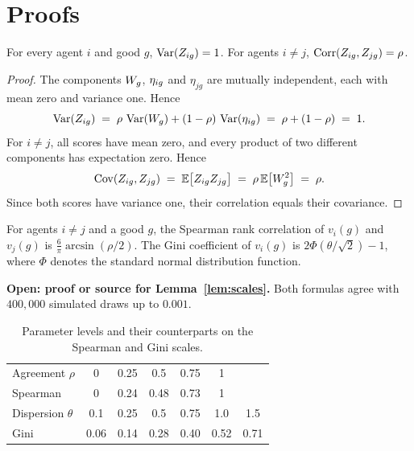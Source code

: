 \chapter{Proofs}\label{app:proofs}

\begin{lemma}\label{lem:scores}
For every agent $i$ and good $g$, $\operatorname{Var}(Z_{ig})=1$. For agents $i\neq j$,
$\operatorname{Corr}(Z_{ig},Z_{jg})=\rho$.
\end{lemma}

\begin{proof}
The components $W_g$, $\eta_{ig}$ and $\eta_{jg}$ are mutually independent, each with mean zero and
variance one. Hence
\[
  \operatorname{Var}(Z_{ig})\;=\;\rho\,\operatorname{Var}(W_g)+(1-\rho)\,\operatorname{Var}(\eta_{ig})\;=\;\rho+(1-\rho)\;=\;1.
\]
For $i\neq j$, all scores have mean zero, and every product of two different components has
expectation zero. Hence
\[
  \operatorname{Cov}(Z_{ig},Z_{jg})\;=\;\mathbb{E}\big[Z_{ig} Z_{jg}\big]
  \;=\;\rho\,\mathbb{E}\big[W_g^2\big]\;=\;\rho.
\]
Since both scores have variance one, their correlation equals their covariance.
\end{proof}

\begin{lemma}\label{lem:scales}
For agents $i\neq j$ and a good $g$, the Spearman rank correlation of $v_i(g)$ and $v_j(g)$ is
$\frac{6}{\pi}\arcsin(\rho/2)$. The Gini coefficient of $v_i(g)$ is $2\Phi(\theta/\sqrt{2})-1$,
where $\Phi$ denotes the standard normal distribution function.
\end{lemma}

\textbf{Open: proof or source for Lemma~\ref{lem:scales}.} Both formulas agree with $400{,}000$
simulated draws up to $0.001$.

\begin{table}[ht]
  \centering
  \caption{Parameter levels and their counterparts on the Spearman and Gini scales.}\label{tab:scales}
  \begin{tabular}{lcccccc}
    \toprule
    Agreement $\rho$ & 0 & 0.25 & 0.5 & 0.75 & 1 & \\
    Spearman & 0 & 0.24 & 0.48 & 0.73 & 1 & \\
    \midrule
    Dispersion $\theta$ & 0.1 & 0.25 & 0.5 & 0.75 & 1.0 & 1.5 \\
    Gini & 0.06 & 0.14 & 0.28 & 0.40 & 0.52 & 0.71 \\
    \bottomrule
  \end{tabular}
\end{table}
